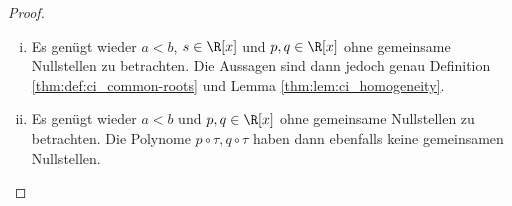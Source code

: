 \documentclass{mythesis}
\begin{document}
\begin{proposition}
\begin{proof}
\begin{enumerate}[i)]
                Die Unterteilung in Definition \ref{thm:def:ci_pwpoly} erlaubt es uns, die Aussage auf den rein polynomiellen Fall zu reduzieren.
                Wie bereits in Definition \ref{thm:def:ci_common-roots} bemerkt, können wir davon ausgehen, dass $p$ und $q$ keine gemeinsamen Nullstellen auf $[a, b]$ besitzen.

                Sei $\Gamma^- := [a,c]$, $\Gamma^+ := [c,b]$.
                Wir wenden unsere Definition \ref{thm:def:ci} auf die Aussage an und erhalten
                \begin{math}
                    \sum_{x\in[a,b]} \sgn(p(x)) \deg(q|\Boundary\Gamma_\epsilon(x))
                    &= \sum_{x\in[a,c]} \sgn(p(x)) \deg(q|\Boundary\Gamma^-_\epsilon(x)) \\
                    &\quad+ \sum_{x\in[c,b]} \sgn(p(x)) \deg(q|\Boundary\Gamma^+_\epsilon(x)).
                \end{math}
                Hierbei sei $\epsilon$ für jedes $x$ hinreichend klein gewählt, dass Lemma \ref{thm:lem:wn0_const} für alle relevanten Intervalle erfüllt ist.
                Wir beobachten, dass die Umgebungen $\Gamma_\epsilon(x)$, $\Gamma^\pm_\epsilon(x)$ für $x \in [a,c)$, bzw. $a \in (c,b]$ übereinstimmen.
                In $x = c$ folgt die Aussage mit der Subdivision aus Lemma \ref{thm:lem:wn0_prop}, denn
                \begin{math}
                    \Gamma_\epsilon(c) &= [c-\epsilon, c+\epsilon], &
                    \Gamma^-_\epsilon(c) &= [c-\epsilon,c], &
                    \Gamma^+_\epsilon(c) &= [c,c+\epsilon].
                \end{math}

            \item
                Es genügt wieder $a < b$, $s \in \R[x]$ und $p, q \in \R[x]$ ohne gemeinsame Nullstellen zu betrachten.
                Die Aussagen sind dann jedoch genau Definition \ref{thm:def:ci_common-roots} und Lemma \ref{thm:lem:ci_homogeneity}.
            \item
                Es genügt wieder $a < b$ und $p, q \in \R[x]$ ohne gemeinsame Nullstellen zu betrachten.
                Die Polynome $p \circ \tau, q \circ \tau$ haben dann ebenfalls keine gemeinsamen Nullstellen.


\end{enumerate}
\end{proof}
\end{proposition}
\end{document}
